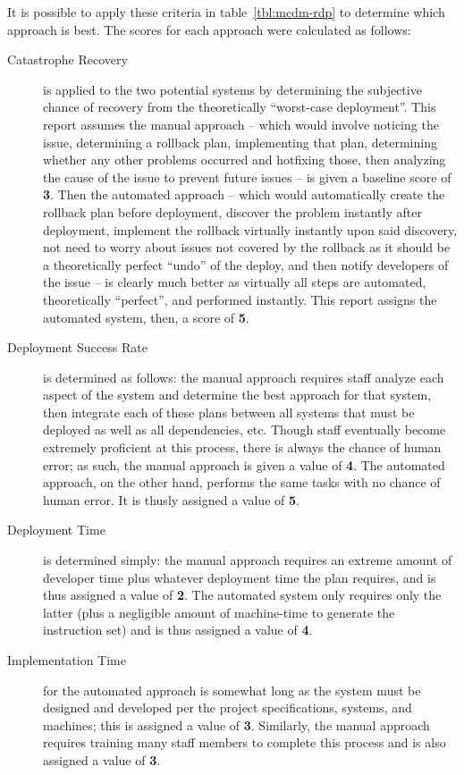 \documentclass[12pt]{article}
\begin{document}
It is possible to apply these criteria in table~\ref{tbl:mcdm-rdp} to determine which approach is best. The scores for each approach were calculated as follows:
\begin{description}
\item[Catastrophe Recovery] is applied to the two potential systems by determining the subjective chance of recovery from the theoretically ``worst-case deployment''. This report assumes the manual approach -- which would involve noticing the issue, determining a rollback plan, implementing that plan, determining whether any other problems occurred and hotfixing those, then analyzing the cause of the issue to prevent future issues -- is given a baseline score of {\bf 3}. Then the automated approach -- which would automatically create the rollback plan before deployment, discover the problem instantly after deployment, implement the rollback virtually instantly upon said discovery, not need to worry about issues not covered by the rollback as it should be a theoretically perfect ``undo'' of the deploy, and then notify developers of the issue -- is clearly much better as virtually all steps are automated, theoretically ``perfect'', and performed instantly. This report assigns the automated system, then, a score of {\bf 5}.
\item[Deployment Success Rate] is determined as follows: the manual approach requires staff analyze each aspect of the system and determine the best approach for that system, then integrate each of these plans between all systems that must be deployed as well as all dependencies, etc. Though staff eventually become extremely proficient at this process, there is always the chance of human error; as such, the manual approach is given a value of {\bf 4}. The automated approach, on the other hand, performs the same tasks with no chance of human error. It is thusly assigned a value of {\bf 5}.
\item[Deployment Time] is determined simply: the manual approach requires an extreme amount of developer time plus whatever deployment time the plan requires, and is thus assigned a value of {\bf 2}. The automated system only requires only the latter (plus a negligible amount of machine-time to generate the instruction set) and is thus assigned a value of {\bf 4}.
\item[Implementation Time] for the automated approach is somewhat long as the system must be designed and developed per the project specifications, systems, and machines; this is assigned a value of {\bf 3}. Similarly, the manual approach requires training many staff members to complete this process and is also assigned a value of {\bf 3}.

\end{description}
\end{document}
